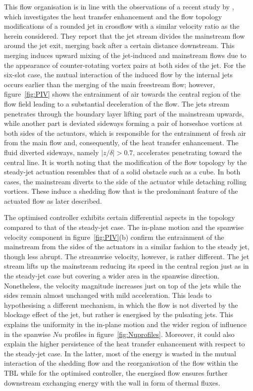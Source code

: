 This flow organisation is in line with the observations of a recent study by \citet{puzu2019jet}, which investigates the heat transfer enhancement and the flow topology modifications of a rounded jet in crossflow with a similar velocity ratio as the herein considered. They report that the jet stream divides the mainstream flow around the jet exit, merging back after a certain distance downstream. This merging induces upward mixing of the jet-induced and mainstream flows due to the appearance of counter-rotating vortex pairs at both sides of the jet. For the six-slot case, the mutual interaction of the induced flow by the internal jets occurs earlier than the merging of the main freestream flow; however, figure~\ref{fig:PIV} shows the entrainment of air towards the central region of the flow field leading to a substantial deceleration of the flow. The jets stream penetrates through the boundary layer lifting part of the mainstream upwards, while another part is deviated sideways forming a pair of horseshoe vortices at both sides of the actuators, which is responsible for the entrainment of fresh air from the main flow and, consequently, of the heat transfer enhancement. The fluid diverted sideways, namely $|z/\delta| > 0.7$, accelerates penetrating toward the central line. It is worth noting that the modification of the flow topology by the steady-jet actuation resembles that of a solid obstacle such as a cube. In both cases, the mainstream diverts to the side of the actuator while detaching rolling vortices. These induce a shedding flow that is the predominant feature of the actuated flow as later described.

The optimised controller exhibits certain differential aspects in the topology compared to that of the steady-jet case. The in-plane motion and the spanwise velocity component in figure~\ref{fig:PIV}(b) confirm the entrainment of the mainstream from the sides of the actuators in a similar fashion to the steady jet, though less abrupt. The streamwise velocity, however, is rather different. The jet stream lifts up the mainstream reducing its speed in the central region just as in the steady-jet case but covering a wider area in the spanwise direction. Nonetheless, the velocity magnitude increases just on top of the jets while the sides remain almost unchanged with mild acceleration. This leads to hypothesising a different mechanism, in which the flow is not diverted by the blockage effect of the jet, but rather is energised by the pulsating jets. This explains the uniformity in the in-plane motion and the wider region of influence in the spanwise $Nu$ profiles in figure~\ref{fig:Nuprofiles}. Moreover, it could also explain the higher persistence of the heat transfer enhancement with respect to the steady-jet case. In the latter, most of the energy is wasted in the mutual interaction of the shedding flow and the reorganisation of the flow within the TBL while for the optimised controller, the energised flow ensures further downstream exchanging energy with the wall in form of thermal fluxes.

